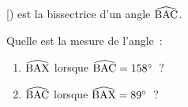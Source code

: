 \documentclass[exercice]{thedocument}%
\begin{document}
%
    [) est la bissectrice d'un angle $\widehat{\text{BAC}}$.\par
    \noindent Quelle est la mesure de l'angle~:
    \begin{enumerate}
        \item $\widehat{\text{BAX}}$ lorsque $\widehat{\text{BAC}}=158^\circ$~?
        \item $\widehat{\text{BAC}}$ lorsque $\widehat{\text{BAX}}=89^\circ$~?
    \end{enumerate}
\end{document}
